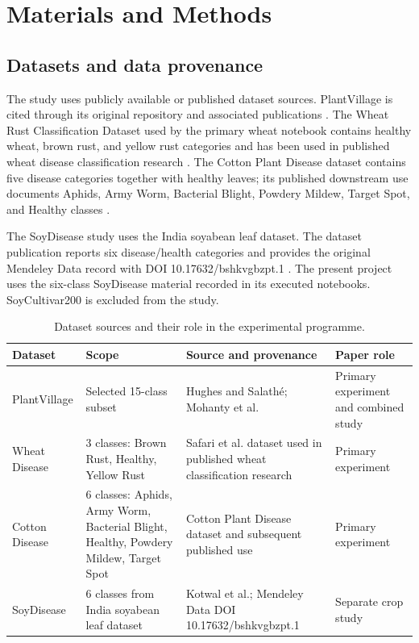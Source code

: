\documentclass[a4paper,fleqn]{cas-dc}
\begin{document}
\section{Materials and Methods}
\subsection{Datasets and data provenance}
The study uses publicly available or published dataset sources. PlantVillage is cited through its original repository and associated publications \citep{hughes2015,mohanty2016}. The Wheat Rust Classification Dataset used by the primary wheat notebook contains healthy wheat, brown rust, and yellow rust categories and has been used in published wheat disease classification research \citep{safari2022}. The Cotton Plant Disease dataset contains five disease categories together with healthy leaves; its published downstream use documents Aphids, Army Worm, Bacterial Blight, Powdery Mildew, Target Spot, and Healthy classes \citep{dhamodharan2023}.

The SoyDisease study uses the India soyabean leaf dataset. The dataset publication reports six disease/health categories and provides the original Mendeley Data record with DOI 10.17632/bshkvgbzpt.1 \citep{kotwal2024}. The present project uses the six-class SoyDisease material recorded in its executed notebooks. SoyCultivar200 is excluded from the study.

\begin{table}[t]
\centering
\caption{Dataset sources and their role in the experimental programme.}
\label{tab:datasets}
\small
\begin{tabularx}{\textwidth}{@{}l l X l@{}}
\toprule
Dataset & Scope & Source and provenance & Paper role \\
\midrule
PlantVillage & Selected 15-class subset & Hughes and Salathé; Mohanty et al. \citep{hughes2015,mohanty2016} & Primary experiment and combined study \\
Wheat Disease & 3 classes: Brown Rust, Healthy, Yellow Rust & Safari et al. dataset used in published wheat classification research \citep{safari2022} & Primary experiment \\
Cotton Disease & 6 classes: Aphids, Army Worm, Bacterial Blight, Healthy, Powdery Mildew, Target Spot & Cotton Plant Disease dataset and subsequent published use \citep{dhamodharan2023} & Primary experiment \\
SoyDisease & 6 classes from India soyabean leaf dataset & Kotwal et al.; Mendeley Data DOI 10.17632/bshkvgbzpt.1 \citep{kotwal2024} & Separate crop study \\
\bottomrule
\end{tabularx}
\end{table}
\end{document}
